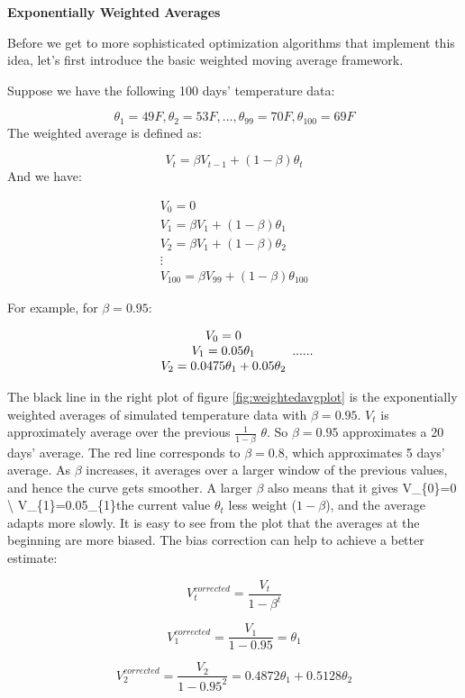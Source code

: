 \documentclass[12pt,]{krantz}
\begin{document}
\textbf{Exponentially Weighted Averages}

Before we get to more sophisticated optimization algorithms that implement this idea, let's first introduce the basic weighted moving average framework.

Suppose we have the following 100 days' temperature data:

\[ \theta_{1}=49F, \theta_{2}=53F, \dots, \theta_{99}=70F, \theta_{100}=69F\]
The weighted average is defined as:

\[V_t = \beta V_{t-1}+(1-\beta)\theta_t\]
And we have:

\[
\begin{array}{c} V_{0}=0\\ V_{1}=\beta V_1 + (1-\beta)\theta_1\\ V_2=\beta V_1 + (1-\beta)\theta_2\\ \vdots \\ V_{100}= \beta V_{99} + (1-\beta)\theta_{100} \end{array}\]

For example, for \(\beta=0.95\):

\[\begin{array}{c} V_{0}=0 \\ V_{1}=0.05\theta_{1}  \\ V_{2}=0.0475\theta_{1}+0.05\theta_{2}   \end{array} \\ ......\]

The black line in the right plot of figure \ref{fig:weightedavgplot} is the exponentially weighted averages of simulated temperature data with \(\beta = 0.95\). \(V_t\) is approximately average over the previous \(\frac{1}{1-\beta}\) \(\theta\). So \(\beta = 0.95\) approximates a 20 days' average. The red line corresponds to \(\beta = 0.8\), which approximates 5 days' average. As \(\beta\) increases, it averages over a larger window of the previous values, and hence the curve gets smoother. A larger \(\beta\) also means that it gives V\_\{0\}=0 \textbackslash{} V\_\{1\}=0.05\theta\_\{1\}the current value \(\theta_t\) less weight (\(1-\beta\)), and the average adapts more slowly. It is easy to see from the plot that the averages at the beginning are more biased. The bias correction can help to achieve a better estimate:

\[V_t^{corrected} = \frac{V_t}{1-\beta^t}\]

\[V_{1}^{corrected}=\frac{V_{1}}{1-0.95}=\theta_{1}\]

\[V_{2}^{corrected}=\frac{V_{2}}{1-0.95^{2}}=0.4872\theta_{1}+0.5128\theta_{2}\]
\end{document}
